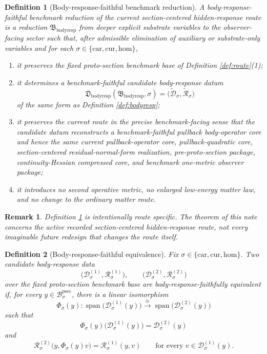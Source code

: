 \documentclass[11pt]{article}
\newcommand{\Car}{\mathrm{car}}
\newcommand{\Cur}{\mathrm{cur}}
\newcommand{\Hom}{\mathrm{hom}}
\newcommand{\ProtoSectionBody}[1]{\mathcal B_{#1}^{\mathrm{psec}}}
\newcommand{\BodyResponseReduction}{\mathfrak B_{\mathrm{bodyresp}}}
\newcommand{\BodyResponseDatum}{\mathfrak D_{\mathrm{bodyresp}}}
\newtheorem{definition}{Definition}
\newtheorem{remark}{Remark}
\begin{document}
\begin{definition}[Body-response-faithful benchmark reduction]
\label{def:reduction}
A \emph{body-response-faithful benchmark reduction} of the current section-centered hidden-response route is a reduction \(\BodyResponseReduction\) from deeper explicit substrate variables to the observer-facing sector such that, after admissible elimination of auxiliary or substrate-only variables and for each \(\sigma\in\{\Car,\Cur,\Hom\}\),
\begin{enumerate}
    \item it preserves the fixed proto-section benchmark base of Definition \ref{def:route}(1);
    \item it determines a benchmark-faithful candidate body-response datum
    \[
    \BodyResponseDatum(\BodyResponseReduction,\sigma)
    =
    \bigl(
    \widetilde{\mathcal D}_{\sigma},
    \widetilde{\mathscr R}_{\sigma}
    \bigr)
    \]
    of the same form as Definition \ref{def:bodyresp};
    \item it preserves the current route in the precise benchmark-facing sense that the candidate datum reconstructs a benchmark-faithful pullback body-operator core and hence the same current pullback-operator core, pullback-quadratic core, section-centered residual-normal-form realization, pre-proto-section package, continuity-Hessian compressed core, and benchmark one-metric observer package;
    \item it introduces no second operative metric, no enlarged low-energy matter law, and no change to the ordinary matter route.
\end{enumerate}
\end{definition}

\begin{remark}
Definition \ref{def:reduction} is intentionally route specific. The theorem of this note concerns the active recorded section-centered hidden-response route, not every imaginable future redesign that changes the route itself.
\end{remark}

\begin{definition}[Body-response-faithful equivalence]
\label{def:equiv}
Fix \(\sigma\in\{\Car,\Cur,\Hom\}\).
Two candidate body-response data
\[
\bigl(\mathcal D_{\sigma}^{(1)},\mathscr R_{\sigma}^{(1)}\bigr),
\qquad
\bigl(\mathcal D_{\sigma}^{(2)},\mathscr R_{\sigma}^{(2)}\bigr)
\]
over the fixed proto-section benchmark base are \emph{body-response-faithfully equivalent} if, for every \(y\in\ProtoSectionBody{\sigma}\), there is a linear isomorphism
\[
\Phi_{\sigma}(y):
\operatorname{span}\bigl(\mathcal D_{\sigma}^{(1)}(y)\bigr)
\xrightarrow{\cong}
\operatorname{span}\bigl(\mathcal D_{\sigma}^{(2)}(y)\bigr)
\]
such that
\[
\Phi_{\sigma}(y)\bigl(\mathcal D_{\sigma}^{(1)}(y)\bigr)
=
\mathcal D_{\sigma}^{(2)}(y)
\]
and
\[
\mathscr R_{\sigma}^{(2)}\bigl(y,\Phi_{\sigma}(y)v\bigr)
=
\mathscr R_{\sigma}^{(1)}(y,v)
\qquad
\text{for every }
v\in\mathcal D_{\sigma}^{(1)}(y).
\]
\end{definition}
\end{document}
